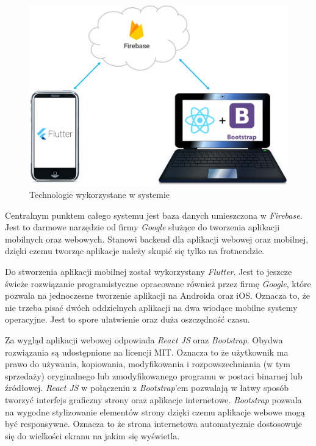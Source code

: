 \documentclass[12pt]{article}
\begin{document}
\begin{figure}[H]
	\centering
		\includegraphics[scale=0.52]{technologie.png}
	\caption{Technologie wykorzystane w systemie}
	\label{technologie}
\end{figure}

Centralnym punktem całego systemu jest baza danych umieszczona w \textit{Firebase}. Jest to darmowe narzędzie od firmy \textit{Google} służące do tworzenia aplikacji mobilnych oraz webowych. Stanowi backend dla aplikacji webowej oraz mobilnej, dzięki czemu tworząc aplikacje należy skupić się tylko na frotnendzie.

Do stworzenia aplikacji mobilnej został wykorzystany \textit{Flutter}. Jest to jeszcze świeże rozwiązanie programistyczne opracowane również przez firmę \textit{Google}, które pozwala na jednoczesne tworzenie aplikacji na Androida oraz iOS. Oznacza to, że nie trzeba pisać dwóch oddzielnych aplikacji na dwa wiodące mobilne systemy operacyjne. Jest to spore ułatwienie oraz duża oszczędność czasu.

Za wygląd aplikacji webowej odpowiada \textit{React JS} oraz \textit{Bootstrap}. Obydwa rozwiązania są udostępnione na licencji MIT. Oznacza to że użytkownik ma prawo do używania, kopiowania, modyfikowania i rozpowszechniania (w tym sprzedaży) oryginalnego lub zmodyfikowanego programu w postaci binarnej lub źródłowej. \textit{React JS} w połączeniu z \textit{Bootstrap}'em pozwalają w łatwy sposób tworzyć interfejs graficzny strony oraz aplikacje internetowe. \textit{Bootstrap} pozwala na wygodne stylizowanie elementów strony dzięki czemu aplikacje webowe mogą być responsywne. Oznacza to że strona internetowa automatycznie dostosowuje się do wielkości ekranu na jakim się wyświetla. 
\end{document}

